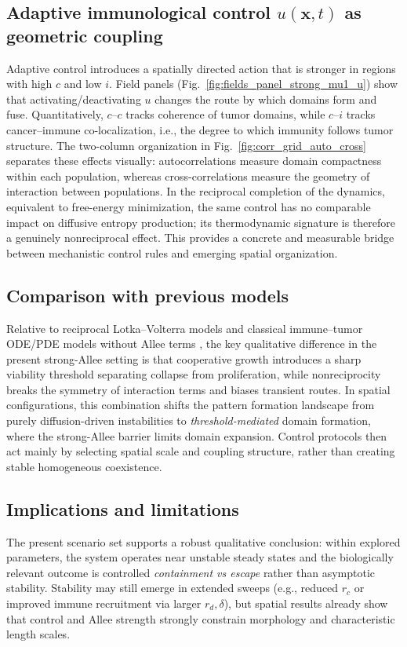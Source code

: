 \subsection{Adaptive immunological control \texorpdfstring{$u(\mathbf{x},t)$}{u(x,t)} as geometric coupling}
Adaptive control introduces a spatially directed action that is stronger in regions with high $c$ and low $i$. Field panels (Fig.~\ref{fig:fields_panel_strong_mu1_u}) show that activating/deactivating $u$ changes the route by which domains form and fuse. Quantitatively, $c$--$c$ tracks coherence of tumor domains, while $c$--$i$ tracks cancer--immune co-localization, i.e., the degree to which immunity follows tumor structure. The two-column organization in Fig.~\ref{fig:corr_grid_auto_cross} separates these effects visually: autocorrelations measure domain compactness within each population, whereas cross-correlations measure the geometry of interaction between populations. In the reciprocal completion of the dynamics, equivalent to free-energy minimization, the same control has no comparable impact on diffusive entropy production; its thermodynamic signature is therefore a genuinely nonreciprocal effect. This provides a concrete and measurable bridge between mechanistic control rules and emerging spatial organization.

\subsection{Comparison with previous models}
Relative to reciprocal Lotka--Volterra models and classical immune--tumor ODE/PDE models without Allee terms \cite{enderling2014}, the key qualitative difference in the present strong-Allee setting is that cooperative growth introduces a sharp viability threshold separating collapse from proliferation, while nonreciprocity breaks the symmetry of interaction terms and biases transient routes. In spatial configurations, this combination shifts the pattern formation landscape from purely diffusion-driven instabilities to \emph{threshold-mediated} domain formation, where the strong-Allee barrier limits domain expansion. Control protocols then act mainly by selecting spatial scale and coupling structure, rather than creating stable homogeneous coexistence.

\subsection{Implications and limitations}
The present scenario set supports a robust qualitative conclusion: within explored parameters, the system operates near unstable steady states and the biologically relevant outcome is controlled \emph{containment vs escape} rather than asymptotic stability. Stability may still emerge in extended sweeps (e.g., reduced $r_c$ or improved immune recruitment via larger $r_d,\delta$), but spatial results already show that control and Allee strength strongly constrain morphology and characteristic length scales.

